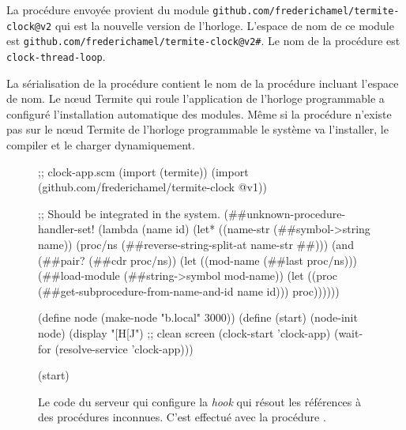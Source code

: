 La procédure envoyée provient du module \texttt{github.com/frederichamel/termite-clock@v2}
qui est la nouvelle version de l'horloge. L'espace de nom de ce module
est \texttt{github.com/frederichamel/termite-clock@v2\#}. Le nom de la procédure
est \texttt{clock-thread-loop}.

La sérialisation de la procédure contient le nom de la procédure incluant
l'espace de nom. Le nœud Termite qui roule l'application de l'horloge
programmable a configuré l'installation automatique des modules. Même si la
procédure n'existe pas sur le nœud Termite de l'horloge programmable le système
va l'installer, le compiler et le charger dynamiquement.\\


\begin{figure}[ht]
  \centering\fontsize{10}{10}
\begin{mplisting}{0.85}
;; clock-app.scm
(import (termite))
(import (github.com/frederichamel/termite-clock @v1))

;; Should be integrated in the system.
(##unknown-procedure-handler-set!
  (lambda (name id)
    (let* ((name-str (##symbol->string name))
           (proc/ns (##reverse-string-split-at name-str #\#)))
      (and (##pair? (##cdr proc/ns))
           (let ((mod-name (##last proc/ns)))
             (##load-module (##string->symbol mod-name))
             (let ((proc (##get-subprocedure-from-name-and-id name id)))
               proc))))))

(define node (make-node "b.local" 3000))
(define (start)
  (node-init node)
  (display "[H[J") ;; clean screen
  (clock-start 'clock-app)
  (wait-for (resolve-service 'clock-app)))

(start)
\end{mplisting}
  \caption{Le code du serveur qui configure la \textit{hook}
    qui résout les références à des procédures inconnues.
    C'est effectué avec la procédure
    .}
  \vspace*{4ex}
\end{figure}


